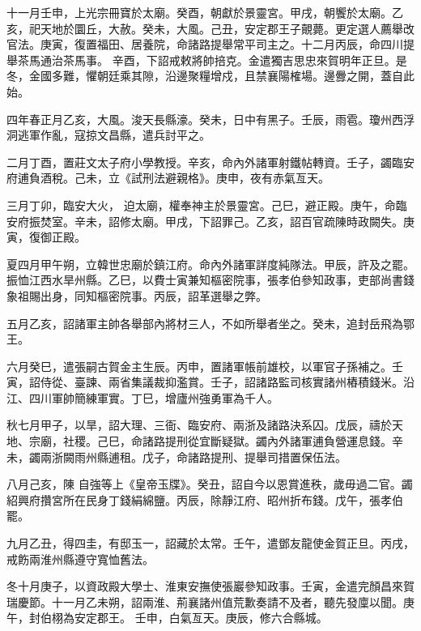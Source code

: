 \begin{pinyinscope}
 十一月壬申，上光宗冊寶於太廟。癸酉，朝獻於景靈宮。甲戌，朝饗於太廟。乙亥，祀天地於圜丘，大赦。癸未，大風。己丑，安定郡王子覿薨。更定選人薦舉改官法。庚寅，復置福田、居養院，命諸路提舉常平司主之。十二月丙辰，命四川提舉茶馬通治茶馬事。
 辛酉，下詔戒敕將帥掊克。金遣獨吉思忠來賀明年正旦。是冬，金國多難，懼朝廷乘其隙，沿邊聚糧增戍，且禁襄陽榷場。邊釁之開，蓋自此始。



 四年春正月乙亥，大風。浚天長縣濠。癸未，日中有黑子。壬辰，雨雹。瓊州西浮洞逃軍作亂，寇掠文昌縣，遣兵討平之。



 二月丁酉，置莊文太子府小學教授。辛亥，命內外諸軍射鐵帖轉資。壬子，蠲臨安府逋負酒稅。己未，立《試刑法避親格》。庚申，夜有赤氣亙天。



 三月丁卯，臨安大火，
 迫太廟，權奉神主於景靈宮。己巳，避正殿。庚午，命臨安府振焚室。辛未，詔修太廟。甲戌，下詔罪己。乙亥，詔百官疏陳時政闕失。庚寅，復御正殿。



 夏四月甲午朔，立韓世忠廟於鎮江府。命內外諸軍詳度純隊法。甲辰，許及之罷。振恤江西水旱州縣。乙巳，以費士寅兼知樞密院事，張孝伯參知政事，吏部尚書錢象祖賜出身，同知樞密院事。丙辰，詔革選舉之弊。



 五月乙亥，詔諸軍主帥各舉部內將材三人，不如所舉者坐之。癸未，追封岳飛為鄂
 王。



 六月癸巳，遣張嗣古賀金主生辰。丙申，置諸軍帳前雄校，以軍官子孫補之。壬寅，詔侍從、臺諫、兩省集議裁抑濫賞。壬子，詔諸路監司核實諸州樁積錢米。沿江、四川軍帥簡練軍實。丁巳，增廬州強勇軍為千人。



 秋七月甲子，以旱，詔大理、三衙、臨安府、兩浙及諸路決系囚。戊辰，禱於天地、宗廟，社稷。己巳，命諸路提刑從宜斷疑獄。蠲內外諸軍逋負營運息錢。辛未，蠲兩浙闕雨州縣逋租。戊子，命諸路提刑、提舉司措置保伍法。



 八月己亥，陳
 自強等上《皇帝玉牒》。癸丑，詔自今以恩賞進秩，歲毋過二官。蠲紹興府攢宮所在民身丁錢絹綿鹽。丙辰，除靜江府、昭州折布錢。戊午，張孝伯罷。



 九月乙丑，得四圭，有邸玉一，詔藏於太常。壬午，遣鄧友龍使金賀正旦。丙戌，戒飭兩淮州縣遵守寬恤舊法。



 冬十月庚子，以資政殿大學士、淮東安撫使張巖參知政事。壬寅，金遣完顏昌來賀瑞慶節。十一月乙未朔，詔兩淮、荊襄諸州值荒歉奏請不及者，聽先發廩以聞。庚午，封伯栩為安定郡王。
 壬申，白氣亙天。庚辰，修六合縣城。




\end{pinyinscope}
